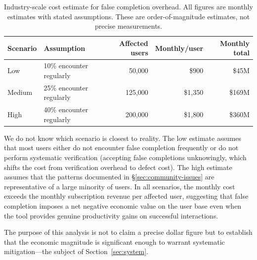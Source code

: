 \begin{table}[h]
\centering
\caption{Industry-scale cost estimate for false completion overhead. All figures are monthly estimates with stated assumptions. These are order-of-magnitude estimates, not precise measurements.}
\label{tab:industry-cost}
\begin{tabular}{llrrr}
\toprule
Scenario & Assumption & Affected users & Monthly/user & Monthly total \\
\midrule
Low    & 10\% encounter regularly & 50{,}000  & \$900  & \$45M \\
Medium & 25\% encounter regularly & 125{,}000 & \$1{,}350 & \$169M \\
High   & 40\% encounter regularly & 200{,}000 & \$1{,}800 & \$360M \\
\bottomrule
\end{tabular}
\end{table}

We do not know which scenario is closest to reality.
The low estimate assumes that most users either do not encounter false completion frequently or do not perform systematic verification (accepting false completions unknowingly, which shifts the cost from verification overhead to defect cost).
The high estimate assumes that the patterns documented in \S\ref{sec:community-issues} are representative of a large minority of users.
In all scenarios, the monthly cost exceeds the monthly subscription revenue per affected user, suggesting that false completion imposes a net negative economic value on the user base even when the tool provides genuine productivity gains on successful interactions.

The purpose of this analysis is not to claim a precise dollar figure but to establish that the economic magnitude is significant enough to warrant systematic mitigation---the subject of Section~\ref{sec:system}.
